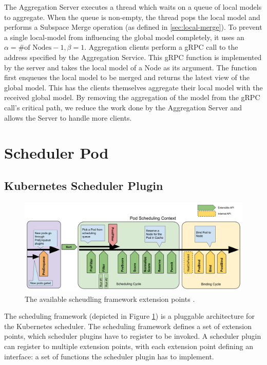 The Aggregation Server executes a thread which waits on a queue of local models
to aggregate. When the queue is non-empty, the thread pops the local model and
performs a Subspace Merge operation (as defined in \ref{sec:local-merge}). To
prevent a single local-model from influencing the global model completely, it
uses an $\alpha = \text{\# of Nodes} - 1, \beta = 1$. Aggregation clients perform
a gRPC call to the address specified by the Aggregation Service. This gRPC
function is implemented by the server and takes the local model of a Node as its
argument. The function first enqueues the local model to be merged and returns
the latest view of the global model. This has the clients themselves aggregate
their local model with the received global model. By removing the aggregation of
the model from the gRPC call's critical path, we reduce the work done by the
Aggregation Server and allows the Server to handle more clients.

\section{Scheduler Pod}
\subsection{Kubernetes Scheduler Plugin}
\begin{figure}[H]
    \centering
    \includegraphics[width=\textwidth]{images/scheduling-framework-extensions.png}
    \caption{The available scheudling framework extension points
    \cite{scheduling-framework}.}
    \label{fig:kube-sched-framework}
\end{figure}
The scheduling framework (depicted in Figure \ref{fig:kube-sched-framework}) is
a pluggable architecture for the Kubernetes scheduler. The scheduling framework
defines a set of extension points, which scheduler plugins have to register to
be invoked. A scheduler plugin can register to multiple extension points, with
each extension point defining an interface: a set of functions the scheduler
plugin has to implement.

